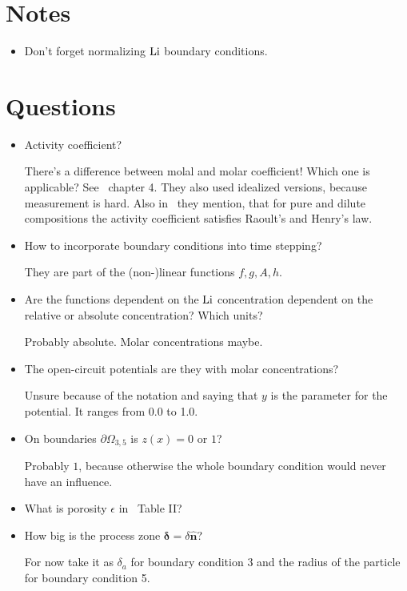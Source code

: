 \documentclass[a4paper,11pt]{scrartcl}
\newcommand*{\Li}{\ce{Li}}
\begin{document}
\section*{Notes}
\begin{itemize}
\item Don't forget normalizing $\Li$ boundary conditions.
\end{itemize}
\section*{Questions}
\begin{itemize}
\item Activity coefficient?

  There's a difference between molal and molar coefficient! Which one is applicable?
  See~\cite{doyle95} chapter 4.
  They also used idealized versions, because measurement is hard.
  Also in~\cite{garcia05} they mention, that for pure and dilute compositions
  the activity coefficient satisfies Raoult's and Henry's law.

\item How to incorporate boundary conditions into time stepping?

  They are part of the (non-)linear functions $f, g, A, h$.

\item Are the functions dependent on the $\Li$ concentration dependent on the
  relative or absolute concentration? Which units?

  Probably absolute. Molar concentrations maybe.

\item The open-circuit potentials are they with molar concentrations?

  Unsure because of the  notation and saying that $y$ is the
  parameter for the potential. It ranges from 0.0 to 1.0.

\item On boundaries $\partial\Omega_{3,5}$ is $z(x) = 0$ or $1$?

  Probably $1$, because otherwise the whole boundary condition would never
  have an influence.

\item What is porosity $\epsilon$ in~\cite{garcia05} Table II?

\item How big is the process zone $\boldsymbol{\delta} = \delta \boldsymbol{\hat{n}}$?

  For now take it as $\delta_a$ for boundary condition 3 and the radius of the
  particle for boundary condition 5.


\end{itemize}
\end{document}
